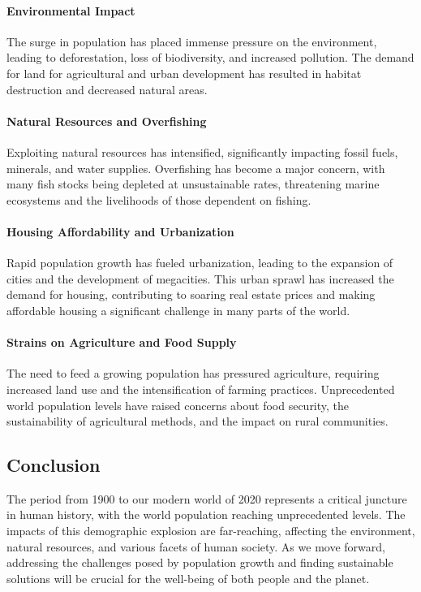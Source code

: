 \documentclass{book}
\begin{document}
\paragraph{Environmental Impact}
The surge in population has placed immense pressure on the environment, leading to deforestation, loss of biodiversity, and increased pollution. The demand for land for agricultural and urban development has resulted in habitat destruction and decreased natural areas.

\paragraph{Natural Resources and Overfishing}
Exploiting natural resources has intensified, significantly impacting fossil fuels, minerals, and water supplies. Overfishing has become a major concern, with many fish stocks being depleted at unsustainable rates, threatening marine ecosystems and the livelihoods of those dependent on fishing.

\paragraph{Housing Affordability and Urbanization}
Rapid population growth has fueled urbanization, leading to the expansion of cities and the development of megacities. This urban sprawl has increased the demand for housing, contributing to soaring real estate prices and making affordable housing a significant challenge in many parts of the world.

\paragraph{Strains on Agriculture and Food Supply}
The need to feed a growing population has pressured agriculture, requiring increased land use and the intensification of farming practices. Unprecedented world population levels have raised concerns about food security, the sustainability of agricultural methods, and the impact on rural communities.

\subsection*{Conclusion}
The period from 1900 to our modern world of 2020 represents a critical juncture in human history, with the world population reaching unprecedented levels. The impacts of this demographic explosion are far-reaching, affecting the environment, natural resources, and various facets of human society. As we move forward, addressing the challenges posed by population growth and finding sustainable solutions will be crucial for the well-being of both people and the planet.
\end{document}
